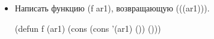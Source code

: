 \begin{itemize}
	(defun f (ar1 ar2) (cons '(ar1) (cons '(ar2) ())))
	
	\begin{figure}[H]
	\end{figure} 
	
	\item Написать функцию (f ar1), возвращающую (((ar1))).
	
	(defun f (ar1) (cons (cons '(ar1) ()) ()))
	

\end{itemize}
